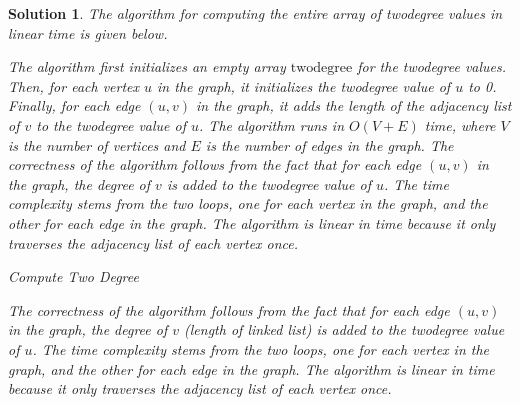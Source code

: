 \documentclass[boxes]{rutgers_hw}
\newtheorem*{solutions}{Solution}
\begin{document}
    \begin{solutions}
        The algorithm for computing the entire array of twodegree values in linear time is given below.


        The algorithm first initializes an empty array $\text{twodegree}$ for the twodegree values. Then, for each vertex $u$ in the graph, it initializes the twodegree value of $u$ to 0. Finally, for each edge $(u, v)$ in the graph, it adds the length of the adjacency list of $v$ to the twodegree value of $u$. The algorithm runs in $O(V + E)$ time, where $V$ is the number of vertices and $E$ is the number of edges in the graph.
        The correctness of the algorithm follows from the fact that for each edge $(u, v)$ in the graph, the degree of $v$ is added to the twodegree value of $u$.
        The time complexity stems from the two loops, one for each vertex in the graph, and the other for each edge in the graph. The algorithm is linear in time because it only traverses the adjacency list of each vertex once.

        \begin{algorithm}
            \caption{Compute Two Degree}
            \begin{algorithmic}[1]
                    \EndFor{}
                        \EndFor{}
                    \EndFor{}
                \EndFunction{}
            \end{algorithmic}
        \end{algorithm}

        The correctness of the algorithm follows from the fact that for each edge $(u, v)$ in the graph, the degree of $v$ (length of linked list) is added to the twodegree value of $u$.
        The time complexity stems from the two loops, one for each vertex in the graph, and the other for each edge in the graph. The algorithm is linear in time because it only traverses the adjacency list of each vertex once.
    \end{solutions}
\end{document}
